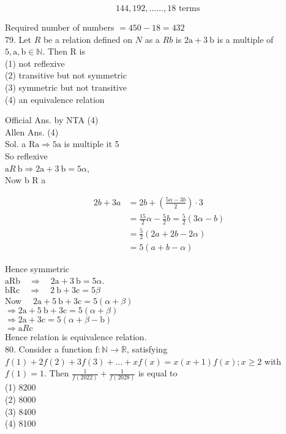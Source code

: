 \documentclass[10pt]{article}
\begin{document}
\[
144,192, \ldots \ldots, 18 \text { terms }
\]

Required number of numbers \(=450-18=432\)\\
79. Let \(R\) be a relation defined on \(N\) as a \(R b\) is \(2 \mathrm{a}+3 \mathrm{~b}\) is a multiple of \(5, \mathrm{a}, \mathrm{b} \in \mathbb{N}\). Then R is\\
(1) not reflexive\\
(2) transitive but not symmetric\\
(3) symmetric but not transitive\\
(4) an equivalence relation

Official Ans. by NTA (4)\\
Allen Ans. (4)\\
Sol. a \(\mathrm{R} \mathrm{a} \Rightarrow 5 \mathrm{a}\) is multiple it 5\\
So reflexive\\
\(\mathrm{a} R \mathrm{~b} \Rightarrow 2 \mathrm{a}+3 \mathrm{~b}=5 \alpha\),\\
Now b R a

\[
\begin{aligned}
2 b+3 a & =2 b+\left(\frac{5 \alpha-3 b}{2}\right) \cdot 3 \\
& =\frac{15}{2} \alpha-\frac{5}{2} b=\frac{5}{2}(3 \alpha-b) \\
& =\frac{5}{2}(2 a+2 b-2 \alpha) \\
& =5(a+b-\alpha)
\end{aligned}
\]

Hence symmetric\\
\(\mathrm{aRb} \quad \Rightarrow \quad 2 \mathrm{a}+3 \mathrm{~b}=5 \alpha\).\\
\(\mathrm{bRc} \quad \Rightarrow \quad 2 \mathrm{~b}+3 \mathrm{c}=5 \beta\)\\
Now \(\quad 2 \mathrm{a}+5 \mathrm{~b}+3 \mathrm{c}=5(\alpha+\beta)\)\\
\(\Rightarrow 2 \mathrm{a}+5 \mathrm{~b}+3 \mathrm{c}=5(\alpha+\beta)\)\\
\(\Rightarrow 2 \mathrm{a}+3 \mathrm{c}=5(\alpha+\beta-\mathrm{b})\)\\
\(\Rightarrow \mathrm{a} R \mathrm{c}\)\\
Hence relation is equivalence relation.\\
80. Consider a function \(\mathrm{f}: \mathbb{N} \rightarrow \mathbb{R}\), satisfying\\
\(f(1)+2 f(2)+3 f(3)+\ldots+x f(x)=x(x+1) f(x) ; x \geq 2\) with \(f(1)=1\). Then \(\frac{1}{f(2022)}+\frac{1}{f(2028)}\) is equal to\\
(1) 8200\\
(2) 8000\\
(3) 8400\\
(4) 8100
\end{document}
